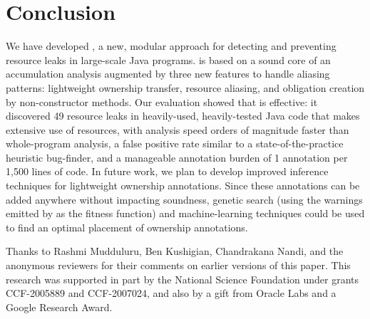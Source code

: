 \documentclass[sigconf,review]{acmart}
\begin{document}
\maketitle



















\section{Conclusion}

We have developed \tool, a new, modular approach for detecting and preventing
resource leaks in large-scale Java programs.  \Tool is based on a sound core of
an accumulation analysis augmented by three new features to handle aliasing
patterns: lightweight ownership transfer, resource aliasing, and obligation
creation by non-constructor methods.  Our evaluation showed that \tool is
effective: it discovered 49 resource leaks in heavily-used, heavily-tested Java code that
makes extensive use of resources, with analysis speed orders of magnitude faster
than whole-program analysis, a false positive rate similar to a
state-of-the-practice heuristic bug-finder, and a manageable annotation burden
of 1 annotation per 1,500 lines of code. In future work, we plan to develop
improved inference techniques for lightweight ownership annotations.  Since
these annotations can be added anywhere without impacting soundness, genetic
search (using the warnings emitted by \tool as the fitness function)
and machine-learning techniques could be used to find an optimal placement
of ownership annotations.

\begin{acks}
Thanks to Rashmi Mudduluru, Ben Kushigian, Chandrakana Nandi, and the anonymous
reviewers for their comments on earlier versions of this paper.  This research
was supported in part by the National Science Foundation under grants
CCF-2005889 and CCF-2007024, and also by a gift from Oracle Labs and a Google
Research Award.

\end{acks}




\end{document}
